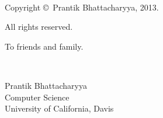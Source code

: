 \documentclass[letterpaper, 12pt, oneside]{book}
\theoremstyle{definition}
\theoremstyle{remark}
\numberwithin{equation}{section}
\numberwithin{figure}{section}
\newcommand{\n}{\vspace{12pt}} %
\begin{document}
    \newpage
    
       
        
        

    ~\\[7.75in] %
    \centerline{Copyright \copyright\ Prantik Bhattacharyya, 2013.}
    \centerline{All rights reserved.}

   \thispagestyle{empty}
    \addtocounter{page}{-1}

    \newpage
    
    
	    \centerline{To friends and family.}
	    
	    \newpage


    
    

    ~\vspace{-1in} %
    \begin{flushright}
        \singlespacing
        Prantik Bhattacharyya\\
        Computer Science\\
        University of California, Davis\\\n
    \end{flushright}
\end{document}
